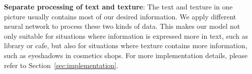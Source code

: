 \textbf{Separate processing of text and texture}:
The text and texture in one picture usually contains most of our desired information.
We apply different neural network to process these two kinds of data.
This makes our model not only suitable for situations where information is expressed more in text,
such as library or cafe,
but also for situations where texture contains more information,
such as eyeshadows in cosmetics shops.
For more implementation details, please refer to Section~\ref{sec:implementation}.





%
%
%














